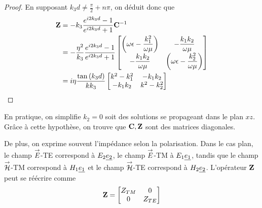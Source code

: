 \begin{proof}
    En supposant $k_3d \not = \frac{\pi}{2} + n\pi$, on déduit donc que
    \begin{align}
        \mathbf{Z} &=  - k_3 \dfrac{e^{i2k_3d} -1}{e^{i2k_3d} +1} \mathbf{C}^{-1} 
        \\
        &= -\dfrac{\eta^2}{k_3} \dfrac{e^{i2k_3d} -1}{e^{i2k_3d} +1}
            \begin{bmatrix}
               \left(\omega\epsilon-\dfrac{k_1^2}{\omega\mu}\right)  & -\dfrac{k_1k_2}{\omega\mu}\\
                -\dfrac{k_1k_2}{\omega\mu} &  \left(\omega\epsilon-\dfrac{k_2^2}{\omega\mu}\right)
            \end{bmatrix}
        \\
        &= i\eta\dfrac{\tan\left(k_3d\right)}{kk_3}
            \begin{bmatrix}
               k^2-k_1^2  & -k_1k_2\\
                -k_1k_2 & k^2-k_2^2\\
            \end{bmatrix}
    \end{align}

\end{proof}

En pratique, on simplifie $k_2 = 0$ soit des solutions se propageant dans le plan $xz$. Grâce à cette hypothèse, on trouve que $\mathbf{C}, \mathbf{Z}$ sont des matrices diagonales. 

De plus, on exprime souvent l'impédance selon la polarisation. Dans le cas plan, le champ ${\overset{\rightarrow}{E}}$-TE correspond à $E_2 \underline{e_2}$, le champ ${\overset{\rightarrow}{E}}$-TM à $E_1 \underline{e_1}$, tandis que le champ ${\overset{\rightarrow}{\mathcal{H}}}$-TM correspond à $H_1 \underline{e_1}$ et le champ ${\overset{\rightarrow}{\mathcal{H}}}$-TE correspond à $H_2 \underline{e_2}$.
L'opérateur $\mathbf{Z}$ peut se réécrire comme 
\begin{equation}
    \mathbf{Z} = 
    \begin{bmatrix}
        Z_{TM} & 0 
        \\
        0 & Z_{TE}
    \end{bmatrix}
\end{equation}


